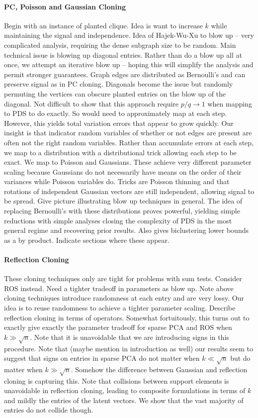 \documentclass[11pt]{article}
\begin{document}
\paragraph{PC, Poisson and Gaussian Cloning} Begin with an instance of planted clique. Idea is want to increase $k$ while maintaining the signal and independence. Idea of Hajek-Wu-Xu to blow up -- very complicated analysis, requiring the dense subgraph size to be random. Main technical issue is blowing up diagonal entries. Rather than do a blow up all at once, we attempt an iterative blow up -- hoping this will simplify the analysis and permit stronger guarantees. Graph edges are distributed as Bernoulli's and can preserve signal as in PC cloning. Diagonals become the issue but randomly permuting the vertices can obscure planted entries on the blow up of the diagonal. Not difficult to show that this approach require $p/q \to 1$ when mapping to PDS to do exactly. So would need to approximately map at each step. However, this yields total variation errors that appear to grow quickly. Our insight is that indicator random variables of whether or not edges are present are often not the right random variables. Rather than accumulate errors at each step, we map to a distribution with a distributional trick allowing each step to be exact. We map to Poisson and Gaussians. These achieve very different parameter scaling because Gaussians do not necessarily have means on the order of their variances while Poisson variables do. Tricks are Poisson thinning and that rotations of independent Gaussian vectors are still independent, allowing signal to be spread. Give picture illustrating blow up techniques in general. The idea of replacing Bernoulli's with these distributions proves powerful, yielding simple reductions with simple analyses closing the complexity of PDS in the most general regime and recovering prior results. Also gives biclustering lower bounds as a by product. Indicate sections where these appear.

\paragraph{Reflection Cloning} These cloning techniques only are tight for problems with sum tests. Consider ROS instead. Need a tighter tradeoff in parameters as blow up. Note above cloning techniques introduce randomness at each entry and are very lossy. Our idea is to reuse randomness to achieve a tighter parameter scaling. Describe reflection cloning in terms of operators. Somewhat fortuitously, this turns out to exactly give exactly the parameter tradeoff for sparse PCA and ROS when $k \gg \sqrt{n}$. Note that it is unavoidable that we are introducing signs in this procedure. Note that (maybe mention in introduction as well) our results seem to suggest that signs on entries in sparse PCA do not matter when $k \ll \sqrt{n}$ but do matter when $k \gg \sqrt{n}$. Somehow the difference between Gaussian and reflection cloning is capturing this. Note that collisions between support elements is unavoidable in reflection cloning, leading to composite formulations in terms of $k$ and mildly the entries of the latent vectors. We show that the vast majority of entries do not collide though.
\end{document}
